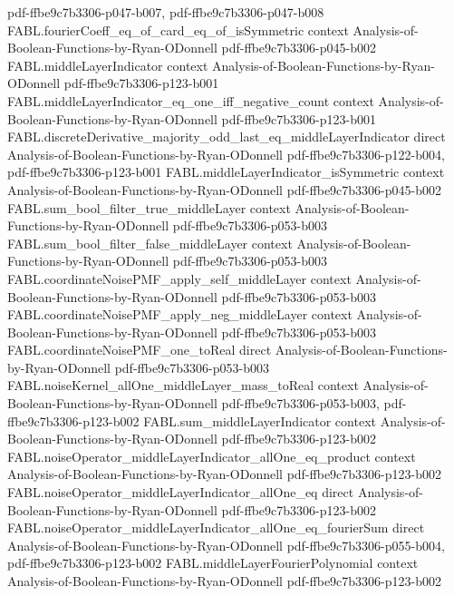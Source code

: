 \begin{theorem}
  {pdf-ffbe9c7b3306-p047-b007,
    pdf-ffbe9c7b3306-p047-b008}
\proofstep
  {FABL.fourierCoeff_eq_of_card_eq_of_isSymmetric}
  {context}
  {Analysis-of-Boolean-Functions-by-Ryan-ODonnell}
  {pdf-ffbe9c7b3306-p045-b002}
\proofstep
  {FABL.middleLayerIndicator}
  {context}
  {Analysis-of-Boolean-Functions-by-Ryan-ODonnell}
  {pdf-ffbe9c7b3306-p123-b001}
\proofstep
  {FABL.middleLayerIndicator_eq_one_iff_negative_count}
  {context}
  {Analysis-of-Boolean-Functions-by-Ryan-ODonnell}
  {pdf-ffbe9c7b3306-p123-b001}
\proofstep
  {FABL.discreteDerivative_majority_odd_last_eq_middleLayerIndicator}
  {direct}
  {Analysis-of-Boolean-Functions-by-Ryan-ODonnell}
  {pdf-ffbe9c7b3306-p122-b004,
    pdf-ffbe9c7b3306-p123-b001}
\proofstep
  {FABL.middleLayerIndicator_isSymmetric}
  {context}
  {Analysis-of-Boolean-Functions-by-Ryan-ODonnell}
  {pdf-ffbe9c7b3306-p045-b002}
\proofstep
  {FABL.sum_bool_filter_true_middleLayer}
  {context}
  {Analysis-of-Boolean-Functions-by-Ryan-ODonnell}
  {pdf-ffbe9c7b3306-p053-b003}
\proofstep
  {FABL.sum_bool_filter_false_middleLayer}
  {context}
  {Analysis-of-Boolean-Functions-by-Ryan-ODonnell}
  {pdf-ffbe9c7b3306-p053-b003}
\proofstep
  {FABL.coordinateNoisePMF_apply_self_middleLayer}
  {context}
  {Analysis-of-Boolean-Functions-by-Ryan-ODonnell}
  {pdf-ffbe9c7b3306-p053-b003}
\proofstep
  {FABL.coordinateNoisePMF_apply_neg_middleLayer}
  {context}
  {Analysis-of-Boolean-Functions-by-Ryan-ODonnell}
  {pdf-ffbe9c7b3306-p053-b003}
\proofstep
  {FABL.coordinateNoisePMF_one_toReal}
  {direct}
  {Analysis-of-Boolean-Functions-by-Ryan-ODonnell}
  {pdf-ffbe9c7b3306-p053-b003}
\proofstep
  {FABL.noiseKernel_allOne_middleLayer_mass_toReal}
  {context}
  {Analysis-of-Boolean-Functions-by-Ryan-ODonnell}
  {pdf-ffbe9c7b3306-p053-b003,
    pdf-ffbe9c7b3306-p123-b002}
\proofstep
  {FABL.sum_middleLayerIndicator}
  {context}
  {Analysis-of-Boolean-Functions-by-Ryan-ODonnell}
  {pdf-ffbe9c7b3306-p123-b002}
\proofstep
  {FABL.noiseOperator_middleLayerIndicator_allOne_eq_product}
  {context}
  {Analysis-of-Boolean-Functions-by-Ryan-ODonnell}
  {pdf-ffbe9c7b3306-p123-b002}
\proofstep
  {FABL.noiseOperator_middleLayerIndicator_allOne_eq}
  {direct}
  {Analysis-of-Boolean-Functions-by-Ryan-ODonnell}
  {pdf-ffbe9c7b3306-p123-b002}
\proofstep
  {FABL.noiseOperator_middleLayerIndicator_allOne_eq_fourierSum}
  {direct}
  {Analysis-of-Boolean-Functions-by-Ryan-ODonnell}
  {pdf-ffbe9c7b3306-p055-b004,
    pdf-ffbe9c7b3306-p123-b002}
\proofstep
  {FABL.middleLayerFourierPolynomial}
  {context}
  {Analysis-of-Boolean-Functions-by-Ryan-ODonnell}
  {pdf-ffbe9c7b3306-p123-b002}

\end{theorem}
